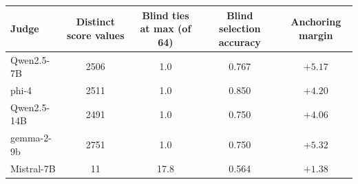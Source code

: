 \begin{tabular}{lcccc}
\toprule
Judge & Distinct score values & Blind ties at max (of 64) & Blind selection accuracy & Anchoring margin \\
\midrule
Qwen2.5-7B & 2506 & 1.0 & 0.767 & $+5.17$ \\
phi-4 & 2511 & 1.0 & 0.850 & $+4.20$ \\
Qwen2.5-14B & 2491 & 1.0 & 0.750 & $+4.06$ \\
gemma-2-9b & 2751 & 1.0 & 0.750 & $+5.32$ \\
Mistral-7B & 11 & 17.8 & 0.564 & $+1.38$ \\
\bottomrule
\end{tabular}
